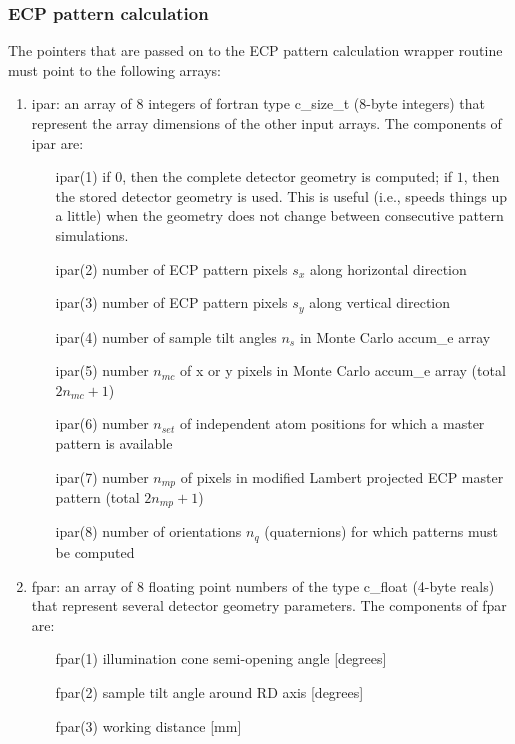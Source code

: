 \documentclass[DIV=calc, paper=letter, fontsize=11pt]{scrartcl}	 %
\begin{document}
\subsubsection{ECP pattern calculation}
The pointers that are passed on to the ECP pattern calculation wrapper routine must point to the following arrays:
\begin{enumerate}
	\item \textsf{ipar}: an array of $8$ integers of fortran type \textsf{c\_size\_t} ($8$-byte integers) that represent the array dimensions
	of the other input arrays.  The components of \textsf{ipar} are:
		\begin{enumerate}
			\item[\textsf{ipar}(1)] if $0$, then the complete detector geometry is computed; if $1$, then the stored detector geometry is used.  This is useful (i.e., speeds things up a little)
			when the geometry does not change between consecutive pattern simulations.
			\item[\textsf{ipar}(2)] number of ECP pattern pixels $s_x$ along horizontal direction
			\item[\textsf{ipar}(3)] number of ECP pattern pixels $s_y$ along vertical direction
			\item[\textsf{ipar}(4)] number of sample tilt angles $n_s$ in Monte Carlo \textsf{accum\_e} array
			\item[\textsf{ipar}(5)] number $n_{mc}$ of x or y pixels in Monte Carlo \textsf{accum\_e} array (total $2n_{mc}+1$)
			\item[\textsf{ipar}(6)] number $n_{set}$ of independent atom positions for which a master pattern is available
			\item[\textsf{ipar}(7)] number $n_{mp}$ of pixels in modified Lambert projected ECP master pattern (total $2n_{mp}+1$)
			\item[\textsf{ipar}(8)] number of orientations $n_q$ (quaternions) for which patterns must be computed
		\end{enumerate}
	\item \textsf{fpar}: an array of $8$ floating point numbers of the type \textsf{c\_float} (4-byte reals) that represent several detector geometry parameters. The 
	components of \textsf{fpar} are:
	\begin{enumerate}
		\item[\textsf{fpar}(1)] illumination cone semi-opening angle [degrees]
		\item[\textsf{fpar}(2)] sample tilt angle around RD axis [degrees]
		\item[\textsf{fpar}(3)] working distance [mm]

\end{enumerate}
\end{enumerate}
\end{document}
